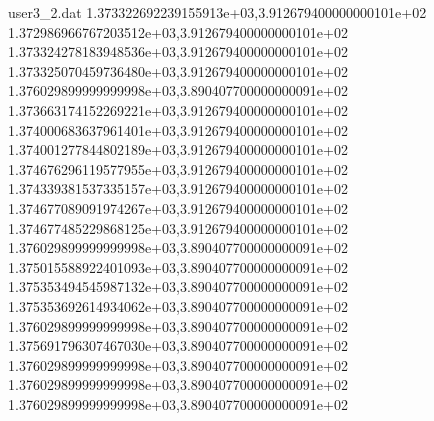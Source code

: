 \begin{filecontents}{user3_2.dat}
1.373322692239155913e+03,3.912679400000000101e+02
1.372986966767203512e+03,3.912679400000000101e+02
1.373324278183948536e+03,3.912679400000000101e+02
1.373325070459736480e+03,3.912679400000000101e+02
1.376029899999999998e+03,3.890407700000000091e+02
1.373663174152269221e+03,3.912679400000000101e+02
1.374000683637961401e+03,3.912679400000000101e+02
1.374001277844802189e+03,3.912679400000000101e+02
1.374676296119577955e+03,3.912679400000000101e+02
1.374339381537335157e+03,3.912679400000000101e+02
1.374677089091974267e+03,3.912679400000000101e+02
1.374677485229868125e+03,3.912679400000000101e+02
1.376029899999999998e+03,3.890407700000000091e+02
1.375015588922401093e+03,3.890407700000000091e+02
1.375353494545987132e+03,3.890407700000000091e+02
1.375353692614934062e+03,3.890407700000000091e+02
1.376029899999999998e+03,3.890407700000000091e+02
1.375691796307467030e+03,3.890407700000000091e+02
1.376029899999999998e+03,3.890407700000000091e+02
1.376029899999999998e+03,3.890407700000000091e+02
1.376029899999999998e+03,3.890407700000000091e+02
\end{filecontents}